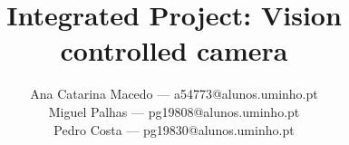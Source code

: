 \documentclass{acmtog}
\begin{document}

\title{Integrated Project: Vision controlled camera} %

\author{
Ana Catarina Macedo --- {\ttfamily a54773@alunos.uminho.pt}\\
Miguel Palhas --- {\ttfamily pg19808@alunos.uminho.pt}\\
Pedro Costa --- {\ttfamily pg19830@alunos.uminho.pt}\\
}





\maketitle

%
\end{document}
